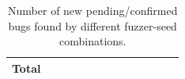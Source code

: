 \begin{table}[htbp]
{\begin{tabular}{|l|cc|cc|cc|cc|cc|cc|}
			\hline
			\textbf{Total} 
			&    \NoSeedTotalPending{}     &     \NoSeedTotalConfirmed{}      &    \SpecBenchTotalPending{}     &     \SpecBenchTotalConfirmed{}      &    \WasmBenchTotalPending{}     &     \WasmBenchTotalConfirmed{}      &    \TransBenchTotalPending{}     &     \TransBenchTotalConfirmed{}      &    \BugBenchTotalPending{}     &     \BugBenchTotalConfirmed{}      &    \TotalTotalPending{}     &     \TotalTotalConfirmed{}      \\
			
			\hline
		\end{tabular}%
	}
	\caption{Number of new pending/confirmed bugs found by different fuzzer-seed combinations.}
	\label{tab:newbugs}
\end{table}